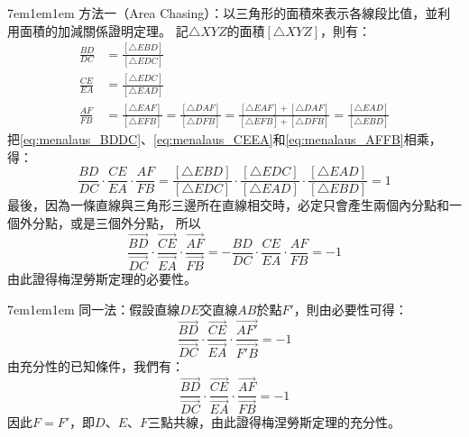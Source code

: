 \documentclass[12pt]{article}
\newif\ifshow
\begin{document}
\ifshow
\newpage
\begin{mybox}[必要性證明]{7em}{1em}{1em}
    方法一（Area Chasing）：以三角形的面積來表示各線段比值，並利用面積的加減關係證明定理。
    記$\triangle{XYZ}$的面積$[\triangle{XYZ}]$，則有：
    \begin{align}
        \frac{BD}{DC}&=\frac{[\triangle{EBD}]}{[\triangle{EDC}]}\label{eq:menalaus_BDDC}\\
        \frac{CE}{EA}&=\frac{[\triangle{EDC}]}{[\triangle{EAD}]}\label{eq:menalaus_CEEA}\\
        \frac{AF}{FB}&=\frac{[\triangle{EAF}]}{[\triangle{EFB}]}
        =\frac{[\triangle{DAF}]}{[\triangle{DFB}]}
        =\frac{[\triangle{EAF}]+[\triangle{DAF}]}{[\triangle{EFB}]+[\triangle{DFB}]}
        =\frac{[\triangle{EAD}]}{[\triangle{EBD}]}\label{eq:menalaus_AFFB}
    \end{align}
    把\eqref{eq:menalaus_BDDC}、\eqref{eq:menalaus_CEEA}和\eqref{eq:menalaus_AFFB}相乘，得：
    \begin{equation}
        \frac{BD}{DC}
        \cdot\frac{CE}{EA}
        \cdot\frac{AF}{FB}
        =\frac{[\triangle{EBD}]}{[\triangle{EDC}]}
        \cdot\frac{[\triangle{EDC}]}{[\triangle{EAD}]}
        \cdot\frac{[\triangle{EAD}]}{[\triangle{EBD}]}
        =1\label{eq:menalaus_novec}
    \end{equation}
    最後，因為一條直線與三角形三邊所在直線相交時，必定只會產生兩個內分點和一個外分點，或是三個外分點，
    所以
    \begin{equation}
        \frac{\overrightarrow{BD}}{\overrightarrow{DC}}
        \cdot\frac{\overrightarrow{CE}}{\overrightarrow{EA}}
        \cdot\frac{\overrightarrow{AF}}{\overrightarrow{FB}}
        =-\frac{BD}{DC}
        \cdot\frac{CE}{EA}
        \cdot\frac{AF}{FB}=-1\label{eq:menalaus_vec}
    \end{equation}
    由此證得梅涅勞斯定理的必要性。
\end{mybox}
\begin{mybox}[充分性證明]{7em}{1em}{1em}
    同一法：假設直線$DE$交直線$AB$於點$F'$，則由必要性可得：
    \[
        \frac{\overrightarrow{BD}}{\overrightarrow{DC}}
        \cdot\frac{\overrightarrow{CE}}{\overrightarrow{EA}}
        \cdot\frac{\overrightarrow{AF'}}{\overrightarrow{F'B}}=-1
    \]
    由充分性的已知條件，我們有：
    \[
        \frac{\overrightarrow{BD}}{\overrightarrow{DC}}
        \cdot\frac{\overrightarrow{CE}}{\overrightarrow{EA}}
        \cdot\frac{\overrightarrow{AF}}{\overrightarrow{FB}}=-1
    \]
    因此$F=F'$，即$D$、$E$、$F$三點共線，由此證得梅涅勞斯定理的充分性。
\end{mybox}
\end{document}

